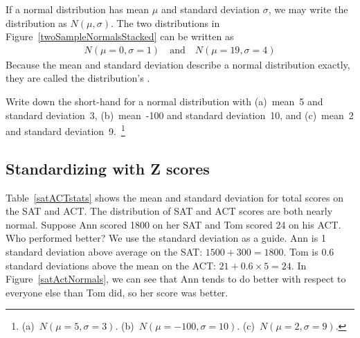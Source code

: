 If a normal distribution has mean $\mu$ and standard deviation $\sigma$, we may write the distribution as $N(\mu, \sigma)$. The two distributions in Figure~\ref{twoSampleNormalsStacked} can be written as
\begin{align*}
N(\mu=0,\sigma=1)\quad\text{and}\quad N(\mu=19,\sigma=4)
\end{align*}
Because the mean and standard deviation describe a normal distribution exactly, they are called the distribution's .

\begin{exercise}
Write down the short-hand for a normal distribution with (a)~mean~5 and standard deviation~3, (b)~mean~-100 and standard deviation~10, and (c)~mean~2 and standard deviation~9.~\footnote{(a)~$N(\mu=5,\sigma=3)$. (b)~$N(\mu=-100, \sigma=10)$. (c)~$N(\mu=2, \sigma=9)$.}
\end{exercise}


\subsection{Standardizing with Z scores}

\begin{example}{Table~\ref{satACTstats} shows the mean and standard deviation for total scores on the SAT and ACT. The distribution of SAT and ACT scores are both nearly normal. Suppose Ann scored 1800 on her SAT and Tom scored 24 on his ACT. Who performed better?}\label{actSAT}
We use the standard deviation as a guide. Ann is 1 standard deviation above average on the SAT: $1500 + 300=1800$. Tom is 0.6 standard deviations above the mean on the ACT: $21+0.6\times 5=24$. In Figure~\ref{satActNormals}, we can see that Ann tends to do better with respect to everyone else than Tom did, so her score was better.
\end{example}

